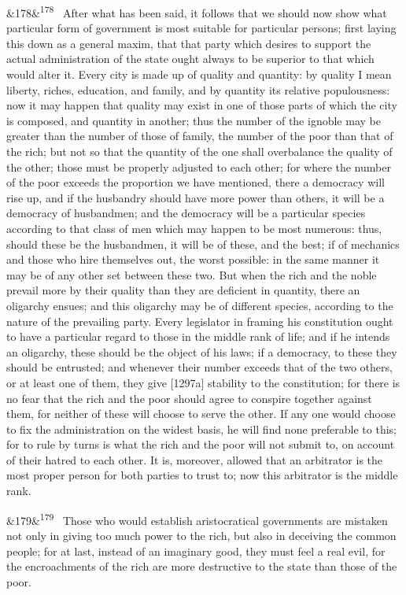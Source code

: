 \documentclass[12pt]{article}
\newcommand{\para}[1][]{\par\noindent\ifx&#1&\else\textsuperscript{\footnotesize #1}~\fi}
\begin{document}
\para[178] After what has been said, it follows that we should now show what particular form of government is most suitable for particular persons; first laying this down as a general maxim, that that party which desires to support the actual administration of the state ought always to be superior to that which would alter it. Every city is made up of quality and quantity: by quality I mean liberty, riches, education, and family, and by quantity its relative populousness: now it may happen that quality may exist in one of those parts of which the city is composed, and quantity in another; thus the number of the ignoble may be greater than the number of those of family, the number of the poor than that of the rich; but not so that the quantity of the one shall overbalance the quality of the other; those must be properly adjusted to each other; for where the number of the poor exceeds the proportion we have mentioned, there a democracy will rise up, and if the husbandry should have more power than others, it will be a democracy of husbandmen; and the democracy will be a particular species according to that class of men which may happen to be most numerous: thus, should these be the husbandmen, it will be of these, and the best; if of mechanics and those who hire themselves out, the worst possible: in the same manner it may be of any other set between these two. But when the rich and the noble prevail more by their quality than they are deficient in quantity, there an oligarchy ensues; and this oligarchy may be of different species, according to the nature of the prevailing party. Every legislator in framing his constitution ought to have a particular regard to those in the middle rank of life; and if he intends an oligarchy, these should be the object of his laws; if a democracy, to these they should be entrusted; and whenever their number exceeds that of the two others, or at least one of them, they give [1297a] stability to the constitution; for there is no fear that the rich and the poor should agree to conspire together against them, for neither of these will choose to serve the other. If any one would choose to fix the administration on the widest basis, he will find none preferable to this; for to rule by turns is what the rich and the poor will not submit to, on account of their hatred to each other. It is, moreover, allowed that an arbitrator is the most proper person for both parties to trust to; now this arbitrator is the middle rank.

\para[179] Those who would establish aristocratical governments are mistaken not only in giving too much power to the rich, but also in deceiving the common people; for at last, instead of an imaginary good, they must feel a real evil, for the encroachments of the rich are more destructive to the state than those of the poor.
\end{document}
